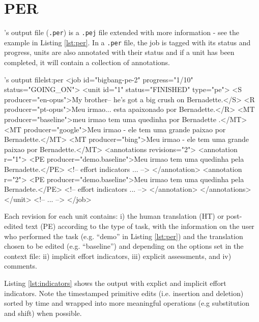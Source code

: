 \section{PER}

\PET's output file ({\tt .per}) is a {\tt .pej} file extended with more information - see the example in Listing \ref{lst:per}.
In a {\tt .per} file, the job is tagged with its status and progress, units are also annotated with their status and if a unit has been completed, it will contain a collection of annotations.

\begin{workflow-code}{\PET's output file}{lst:per}
<job id="bigbang-pe-2" progress="1/10" status="GOING_ON">
	<unit id="1" status="FINISHED" type="pe">
	<S producer="en-opus">My brother-- he's got a big crush on Bernadette.</S>
	<R producer="pt-opus">Meu irmao... esta apaixonado por Bernadette.</R>
	<MT producer="baseline">meu irmao tem uma quedinha por Bernadette .</MT>
	<MT producer="google">Meu irmao - ele tem uma grande paixao por Bernadette.</MT>
	<MT producer="bing">Meu irmao - ele tem uma grande paixao por Bernadette.</MT>
	<annotations revisions="2">
		<annotation r="1">
			<PE producer="demo.baseline">Meu irmao tem uma quedinha pela Bernadette.</PE>
			<!-- effort indicators ... -->
		</annotation>
		<annotation r="2">
			<PE producer="demo.baseline">Meu irmao tem uma quedinha pela Bernadete.</PE>
			<!-- effort indicators ... -->
		</annotation>
	</annotations>
	</unit>
	<!-- ... -->
</job>
\end{workflow-code}

Each revision for each unit contains: i) the human translation (HT) or post-edited text (PE) according to the type of task, with the information on the user who performed the task (e.g. ``demo'' in Listing \ref{lst:per}) and the translation chosen to be edited (e.g. ``baseline'') and depending on the options set in the context file: ii) implicit effort indicators, iii) explicit assessments, and iv) comments.

Listing \ref{lst:indicators} shows the output with explict and implicit effort indicators. Note the timestamped primitive edits (i.e. insertion and deletion) sorted by time and wrapped into more meaningful operations (e.g substitution and shift) when possible.

